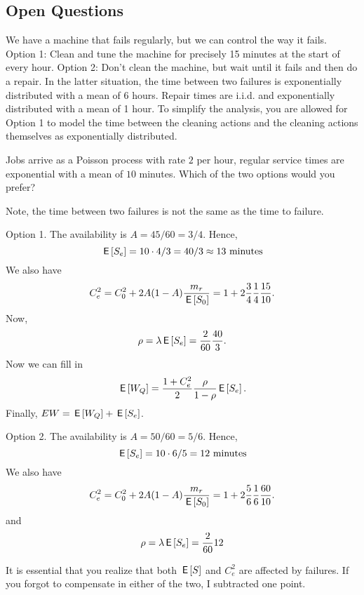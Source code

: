 \subsection{Open Questions}



\begin{exercise}[201706]{2}
  We have a machine that fails regularly, but we can control the way it fails.
  Option 1: Clean and tune the machine for precisely 15 minutes at the start of every hour.
  Option 2: Don't clean the machine, but wait until it fails and then do a repair.
  In the latter situation, the time between two failures is exponentially distributed with a mean of 6 hours.
  Repair times are i.i.d.
  and exponentially distributed with a mean of 1 hour.
  To simplify the analysis, you are allowed for Option 1 to model the time between the cleaning actions and the cleaning actions themselves as exponentially distributed.

Jobs arrive as a Poisson process with rate $2$ per hour, regular service times are exponential with a mean of $10$ minutes. Which of the two options would you prefer?
\begin{solution}
Note, the time between two failures is not the same as the time to failure.


Option 1. The availability is $A=45/60=3/4$. Hence, 
\begin{equation*}
\,\mathsf{E}\left[S_e\right] = 10\cdot 4/3 = 40/3 \approx 13\text{ minutes}
\end{equation*}
We also have
\begin{equation*}
   C_e^2 = C_0^2 + 2A(1-A)\frac{m_r}{\,\mathsf{E}\left[S_0\right]} = 1 + 2\frac{3}{4}\frac1{4}\frac{15}{10}.
 \end{equation*}
Now,
\begin{equation*}
  \rho = \lambda \,\mathsf{E}\left[S_e\right] = \frac{2}{60}\frac{40}3.
\end{equation*}
Now we can fill in 
\begin{equation*}
  \,\mathsf{E}\left[W_Q\right] = \frac{1 + C_e^2}2 \frac{\rho}{1-\rho} \,\mathsf{E}\left[S_e\right].
\end{equation*}
Finally, $E W = \,\mathsf{E}\left[W_Q\right] + \,\mathsf{E}\left[S_e\right]$.


Option 2. The availability is $A=50/60=5/6$. Hence, 
\begin{equation*}
\,\mathsf{E}\left[S_e\right] = 10\cdot 6/5 = 12\text{ minutes}
\end{equation*}
We also have
\begin{equation*}
   C_e^2 = C_0^2 + 2A(1-A)\frac{m_r}{\,\mathsf{E}\left[S_0\right]} = 1 + 2\frac{5}{6}\frac1{6}\frac{60}{10}.
 \end{equation*}
and
\begin{equation*}
  \rho = \lambda \,\mathsf{E}\left[S_e\right] = \frac{2}{60}12
\end{equation*}

It is essential that you realize that both $\,\mathsf{E}\left[S\right]$ and $C_e^2$ are affected by failures. If you forgot to compensate in either of the two, I subtracted one point. 
\end{solution}
\end{exercise}


